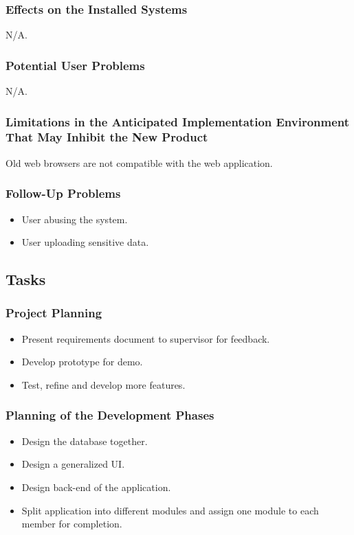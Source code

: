 \documentclass[12pt]{article}
\begin{document}
{\subsubsection{Effects on the Installed Systems}
N/A.
\subsubsection{Potential User Problems}
N/A.
\subsubsection{Limitations in the Anticipated Implementation Environment That 
May Inhibit the New Product}
Old web browsers are not compatible with the web application.
\subsubsection{Follow-Up Problems}
\begin{itemize}
  \item User abusing the system.
  \item User uploading sensitive data.
\end{itemize}

\subsection{Tasks}
\subsubsection{Project Planning}
\begin{itemize}
  \item Present requirements document to supervisor for feedback.
  \item Develop prototype for demo.
  \item Test, refine and develop more features.
\end{itemize}
\subsubsection{Planning of the Development Phases}
\begin{itemize}
    \item Design the database together.
    \item Design a generalized UI.
    \item Design back-end of the application.
    \item Split application into different modules and assign one module to each 
member for completion.
\end{itemize}

}
\end{document}
